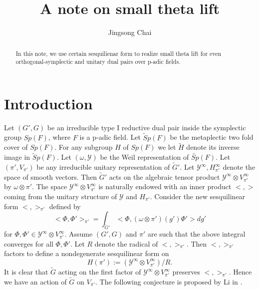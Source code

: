 \documentclass[twoside]{amsart}
\theoremstyle{plain}
\numberwithin{equation}{section}
\begin{document}
\title{A note on small theta lift}


\begin{abstract}
In this note, we use certain sesquilienar form to realize small theta lift for even orthogonal-symplectic and unitary dual pairs over p-adic fields.
\end{abstract}



	\author{Jingsong Chai}
	\address{School of Mathematics, Physics and Finance \\ Anhui Polytechnic University \\Wuhu, Anhui,  241000\\China}



	
	\maketitle
\section{Introduction}

Let $(G',G)$ be an irreducible type I reductive dual pair inside the symplectic group $Sp(F)$, where $F$ is a p-adic field. Let $\tilde{S}p(F)$ be the metaplectic two fold cover of $Sp(F)$. For any subgroup $H$ of $Sp(F)$ we let $\tilde{H}$ denote its inverse image in $\tilde{S}p(F)$. Let $(\omega, \mathcal{Y})$ be the Weil representation of $\tilde{Sp}(F)$. Let $(\pi', V_{\pi'})$ be any irreducible unitary representation of $\tilde{G}'$. Let $\mathcal{Y}^\infty, H_{\pi'}^\infty$ denote the space of smooth vectors. Then $\tilde{G}'$ acts on the algebraic tensor product $\mathcal{Y}^\infty\otimes V_{\pi'}^\infty$ by $\omega\otimes \pi'$. The space $\mathcal{Y}^\infty\otimes V_{\pi'}^\infty$ is naturally endowed with an inner product $<,>$ coming from the unitary structure of $\mathcal{Y}$ and $H_{\pi'}$. Consider the new sesquilinear form $<,>_{\pi'}$ defined by
\[
<\Phi,\Phi'>_{\pi'}=\int_{\tilde{G}'}<\Phi, (\omega\otimes \pi')(g')\Phi'>dg'
\]
for $\Phi,\Phi'\in \mathcal{Y}^\infty\otimes V_{\pi'}^\infty$. Assume $(G',G)$ and $\pi'$ are such that the above integral converges for all $\Phi,\Phi'$. Let $R$ denote the radical of $<,>_{\pi'}$. Then $<,>_{\pi'}$ factors to define a nondegenerate sesquilinear form on
\[
H(\pi'):=(\mathcal{Y}^\infty \otimes V_{\pi'}^\infty)/R.
\]
It is clear that $\tilde{G}$ acting on the first factor of $\mathcal{Y}^\infty\otimes V_{\pi'}^\infty$ preserves $<,>_{\pi'}$. Hence we have an action of $\tilde{G}$ on $V_{\pi'}$. The following conjecture is proposed by Li in \cite{L90}.  \\
\end{document}
